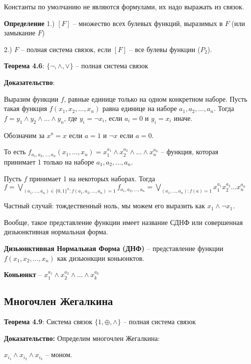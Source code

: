 \documentclass[openany]{article}
\begin{document}
   Константы по умолчанию не являются формулами, их надо выражать из связок.

   \textbf{Определение} 1.) $[F]$ -- множество всех булевых функций, выразимых в $F$ (или замыкание $F$)

   2.) $F$ -- полная система связок, если $[F]$ -- все булевы функции ($P_2$).

   \textbf{Теорема 4.6}: $\{\neg, \wedge, \vee\}$ -- полная система связок

   \textbf{Доказательство}:

   Выразим функции $f$, равные единице только на одном конкретном наборе. Пусть такая функция $f(x_1, x_2, \ldots, x_n)$ равна единице на наборе $a_1, a_2, \ldots, a_n$. Тогда $f = y_1 \wedge y_2 \wedge \ldots \wedge y_n$, где $y_i = \neg x_i$, если $a_i = 0$ и $y_i = x_i$ иначе.

   Обозначим за $x^a = x$ если $a = 1$ и $\neg x$ если $a = 0$.

   То есть $f_{a_1, a_2, \ldots, a_n}(x_1, \ldots, x_n) = x_1^{a_1} \wedge x_2^{a_2} \wedge \ldots \wedge x_n^{a_n}$ -- функция, которая принимает 1 только на наборе $a_1, a_2, \ldots, a_n$.

   Пусть $f$ принимает 1 на некоторых наборах. Тогда $f = \bigvee\limits_{(a_1, \ldots, a_n) \in \{0, 1\}^n : f(a_1, a_2, \ldots, a_n) = 1} f_{a_1, a_2, \ldots, a_n} = \bigvee\limits_{(a_1, \ldots, a_n): f(a) = 1}x_1^{a_1}x_2^{a_2}\ldots x_n^{a_n}$

   Частный случай: тождественный ноль, мы можем его выразить как $x_1 \wedge \neg x_1$.

   Вообще, такое представление функции имеет название СДНФ или совершенная дизьюнктивная нормальная форма.

   \textbf{Дизьюнктивная Нормальная Форма (ДНФ)} -- представление функции $f(x_1, x_2, \ldots, x_n)$ как дизьюнкции коньюнктов.

   \textbf{Коньюнкт} -- $x_1^{a_1} \wedge x_2^{a_2} \wedge \ldots \wedge x_k^{a_k}$

   \subsection{Многочлен Жегалкина}

   \textbf{Теорема 4.9}: Система связок $\{1, \oplus, \wedge\}$ -- полная система связок

   \textbf{Доказательство:} Определим многочлен Жегалкина:

   $x_{i_1} \wedge x_{i_2} \wedge x_{i_k}$ -- моном.
\end{document}
